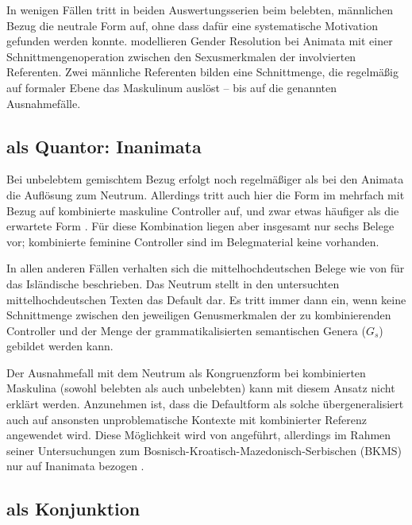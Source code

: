 In wenigen Fällen tritt in beiden Auswertungs\-serien beim belebten, männlichen
Bezug die neutrale Form auf, ohne dass dafür eine systematische Motivation
gefunden werden konnte. \citet{wechslerzlatic2003,wechsler2009} modellieren
Gender Resolution bei Animata mit einer Schnittmengenoperation zwischen den
Sexusmerkmalen der involvierten Referenten. Zwei männliche Referenten bilden
eine Schnittmenge, die regelmäßig auf formaler Ebene das Maskulinum auslöst --
bis auf die genannten Ausnahmefälle.

\subsection{ als Quantor: Inanimata}

Bei unbelebtem gemischtem Bezug erfolgt noch regelmäßiger als bei den Animata
die Auflösung zum Neutrum. Allerdings tritt auch hier die Form
 im \CAO{} mehrfach mit Bezug auf kombinierte
maskuline Controller auf, und zwar etwas häufiger als die erwartete Form
. Für diese Kombination liegen aber insgesamt nur sechs Belege vor;
kombinierte feminine Controller sind im Belegmaterial keine vorhanden.

In allen anderen Fällen verhalten sich die mittelhochdeutschen Belege wie von
\citet{wechslerzlatic2003,wechsler2009} für das Isländische beschrieben. Das
Neutrum stellt in den untersuchten mittelhochdeutschen Texten das Default dar.
Es tritt immer dann ein, wenn keine Schnittmenge zwischen den jeweiligen
Genusmerkmalen der zu kombinierenden Controller und der Menge der
grammatikalisierten semantischen Genera ($G_s$) gebildet werden kann.

Der Ausnahmefall mit dem Neutrum als Kongruenzform bei kombinierten Maskulina
(sowohl belebten als auch unbelebten) kann mit diesem Ansatz nicht erklärt
werden. Anzunehmen ist, dass die Defaultform als solche übergeneralisiert auch
auf ansonsten unproblematische Kontexte mit kombinierter Referenz angewendet
wird. Diese Möglichkeit wird von \textcites[302]{corbett1991} angeführt,
allerdings im Rahmen seiner Untersuchungen zum
Bosnisch-\allowbreak{}Kroatisch-\allowbreak{}Mazedonisch-\allowbreak{}Serbischen
(BKMS) nur auf Inanimata bezogen
\autocites[vgl.~auch][190]{wechslerzlatic2003}[581]{wechsler2009}.

\subsection{ als Konjunktion}

